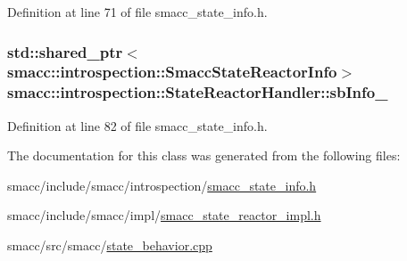 Definition at line 71 of file smacc\+\_\+state\+\_\+info.\+h.

\subsubsection[{\texorpdfstring{sb\+Info\+\_\+}{sbInfo_}}]{\setlength{\rightskip}{0pt plus 5cm}std\+::shared\+\_\+ptr$<${\bf smacc\+::introspection\+::\+Smacc\+State\+Reactor\+Info}$>$ smacc\+::introspection\+::\+State\+Reactor\+Handler\+::sb\+Info\+\_\+}\hypertarget{classsmacc_1_1introspection_1_1StateReactorHandler_a6dbf5d1458265c3565e18ac77851ae63}{}\label{classsmacc_1_1introspection_1_1StateReactorHandler_a6dbf5d1458265c3565e18ac77851ae63}


Definition at line 82 of file smacc\+\_\+state\+\_\+info.\+h.



The documentation for this class was generated from the following files\+:\begin{DoxyCompactItemize}
\item 
smacc/include/smacc/introspection/\hyperlink{smacc__state__info_8h}{smacc\+\_\+state\+\_\+info.\+h}\item 
smacc/include/smacc/impl/\hyperlink{smacc__state__reactor__impl_8h}{smacc\+\_\+state\+\_\+reactor\+\_\+impl.\+h}\item 
smacc/src/smacc/\hyperlink{state__behavior_8cpp}{state\+\_\+behavior.\+cpp}\end{DoxyCompactItemize}
